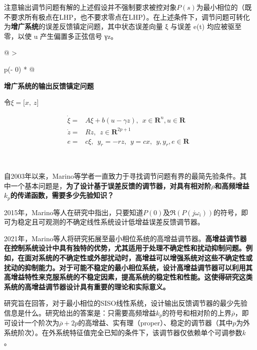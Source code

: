 \documentclass[
  12pt,
  a4paper
]{article}
\begin{document}
注意输出调节问题有解的上述假设并不强制要求被控对象\(P(s)\)为最小相位的（既不要求所有极点在LHP，也不要求零点在LHP）。在上述条件下，调节问题可转化为\textbf{增广系统}的误差反馈镇定问题，其中状态误差向量
ξ 与误差 e(t) 均应被驱至零，以使 u 产生偏置多正弦信号 γz。

\begin{longtable}[]{@{}
  >{\raggedright\arraybackslash}p{}@{}}
\toprule\noalign{}
\begin{minipage}[b]{\linewidth}\raggedright
\textbf{增广系统的输出反馈镇定问题}

令\(\xi = \lbrack x,\ z\rbrack\)

\[\begin{aligned}
\dot{\xi} = & A\xi + b(u - \gamma z),\ \ x \in \mathbf{R}^{n},u \in \mathbf{R} \\
\dot{z} = & Rz,\ \ z \in \mathbf{R}^{2p + 1} \\
e = & {c\xi,\ \ y}_{r} = - rz,\ \ y = cx,\ \ y,y_{r},e \in \mathbf{R}
\end{aligned}\]
\end{minipage} \\
\midrule\noalign{}
\endhead
\bottomrule\noalign{}
\endlastfoot
\end{longtable}

自2003年以来，Marino等学者一直致力于寻找调节问题有界的最简先验条件。其中一个基本问题是，\textbf{为了设计基于误差反馈的调节器，对具有相对阶}\(\rho\)\textbf{和高频增益}\(k_{p}\)\textbf{的传递函数，需要多少先验知识？}

2015年，Marino等人在研究中指出，只要知道\(P(0)\)及\(\mathfrak{R}\left( P(j\omega_{i}) \right)\)的符号，即可为稳定且可观测的不确定线性系统设计低增益误差反馈调节器。

2021年，Marino等人将研究拓展至最小相位系统的高增益调节器。\textbf{高增益调节器在控制系统设计中具有独特的优势，尤其适用于处理不确定性和扰动抑制问题。例如，在面对系统的不确定性或外部扰动时，高增益可以增强系统对这些不确定性或扰动的抑制能力。对于可能不稳定的最小相位系统，设计高增益调节器可以利用其高增益特性来克服系统的不稳定因素，提高系统的稳定性和性能。这使得研究这类系统的高增益调节器设计具有重要的理论和实际意义。}

研究旨在回答，对于最小相位的SISO线性系统，设计输出反馈调节器的最少先验信息是什么。研究给出的答案是：只需要高频增益\(k_{p}\)的符号和相对阶的上界\(\overline{\rho}\)，即可设计一个阶次为\(\overline{\rho} + 2p\)的高增益、实有理（proper）、稳定的调节器（其中\(p\)为外系统阶次）。在外系统特征值完全已知的条件下，该调节器仅依赖单个可调参数\(k\)。
\end{document}
